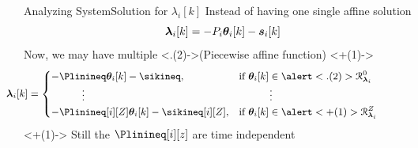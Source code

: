 \documentclass[aspectratio=169]{beamer}
\begin{document}
\begin{frame}{Analyzing System}{Solution for $\lambda_{i}[k]$}
  \centering
  Instead of having one single affine solution
  \begin{equation*}
    \lambdaik=-\Plin\thetaik-\sik
  \end{equation*}
  \pause
  Now, we may have multiple \onslide<.(2)->{(Piecewise affine function)}
  \onslide<+(1)->{
    \begin{equation*}
      \small
      \hspace{-2cm}
      \begin{aligned}
        \lambdaik=
        \begin{cases}
          {-\Plinineq\thetaik-\sikineq},&\text{if}\ \thetaik \in\alert<.(2)>{\set{R}_{\lambdai}^{0}}\tikzmark{a}\\
          \qquad\quad \vdots&\qquad\quad \vdots\\
          -\Plinineq[i][Z]\thetaik-\sikineq[i][Z],&\text{if}\ \thetaik \in\alert<+(1)>{\set{R}_{\lambdai}^{Z}}\\
        \end{cases}
      \end{aligned}
    \end{equation*}
  }
  \onslide<+(1)->{
    \alert<+>{Still the $\Plinineq[i][z]$ are time independent}
  }
\end{frame}
\end{document}
